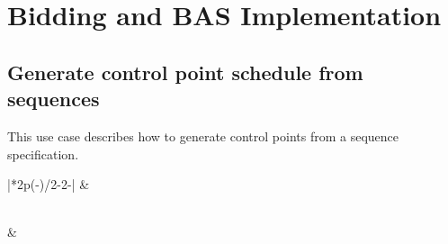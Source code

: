 \documentclass[letterpaper,10pt, openany,english]{sphinxmanual}
\begin{document}
\section{Bidding and BAS Implementation}
\label{\detokenize{useCases:bidding-and-bas-implementation}}

\subsection{Generate control point schedule from sequences}
\label{\detokenize{useCases:generate-control-point-schedule-from-sequences}}
This use case describes how to generate control points
from a sequence specification.


\begin{savenotes}\sphinxatlongtablestart\begin{longtable}{|*{2}{p{}|}}
\hline
\sphinxstyletheadfamily 
{}
&\sphinxstyletheadfamily 
{}
\\
\hline
\endfirsthead

%
{}\\
\hline
\sphinxstyletheadfamily 
{}
&\sphinxstyletheadfamily 
{}
\\
\hline
\endhead

\hline
{}\\
\endfoot

\endlastfoot


\end{longtable}
\end{savenotes}
\end{document}
